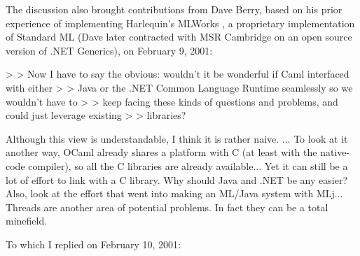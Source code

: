 \documentclass[acmsmall,review]{acmart}\settopmatter{printfolios=true,printccs=false,printacmref=false}
\begin{document}
The discussion also brought contributions from Dave Berry, based on his prior experience of implementing Harlequin’s MLWorks , a proprietary implementation of Standard ML (Dave later contracted with MSR Cambridge on an open source version of .NET Generics), on February 9, 2001:
\begin{verbquote}
> > Now I have to say the obvious: wouldn't it be wonderful if Caml interfaced with either 
> > Java or the .NET Common Language Runtime seamlessly so we wouldn't have to 
> > keep facing these kinds of questions and problems, and could just leverage existing 
> > libraries?   

Although this view is understandable, I think it is rather naive. ... To look at it another way, OCaml already shares a platform with C (at least with the native-code compiler), so all the C libraries are already available... Yet it can still be a lot of effort to link with a C library.  Why should Java and .NET be any easier?  Also, look at the effort that went into making an ML/Java system with MLj... Threads are another area of potential problems.  In fact they can be a total minefield.   
\end{verbquote}
To which I replied on February 10, 2001:
\end{document}
